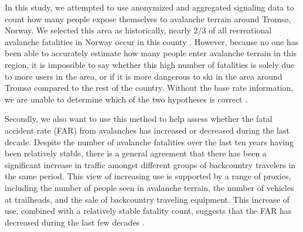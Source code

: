 \documentclass[authordate,empirical]{jote-new-article}
\begin{document}
In this study, we attempted to use anonymized and aggregated signaling data to count how many people expose themselves to avalanche terrain around Tromsø, Norway. We selected this area as historically, nearly 2/3 of all recreational avalanche fatalities in Norway occur in this county \parencites{Varsom2021}. However, because no one has been able to accurately estimate how many people enter avalanche terrain in this region, it is impossible to say whether this high number of fatalities is solely due to more users in the area, or if it is more dangerous to ski in the area around Tromsø compared to the rest of the country. Without the base rate information, we are unable to determine which of the two hypotheses is correct \parencites{Johnson2020}{Kahneman1973}.







Secondly, we also want to use this method to help assess whether the fatal accident rate (FAR) from avalanches has increased or decreased during the last decade. Despite the number of avalanche fatalities over the last ten years having been relatively stable, there is a general agreement that there has been a significant increase in traffic amongst different groups of backcountry travelers in the same period. This view of increasing use is supported by a range of proxies, including the number of people seen in avalanche terrain, the number of vehicles at trailheads, and the sale of backcountry traveling equipment. This increase of use, combined with a relatively stable fatality count, suggests that the FAR has decreased during the last few decades \parencites{Techel2016}.
\end{document}
